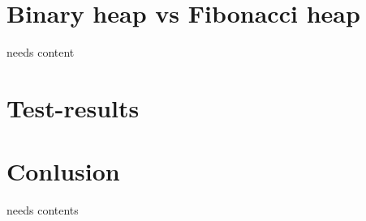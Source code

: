 \documentclass[oneside,11pt,openright]{report}
\begin{document}
\chapter{Binary heap vs Fibonacci heap}

needs content

\chapter{Test-results}













\chapter{Conlusion}

needs contents



 

\end{document}
